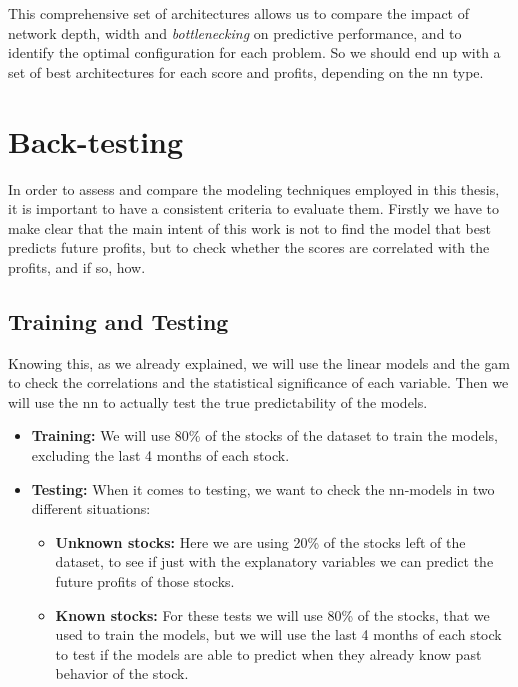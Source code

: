 \documentclass[11pt,english,a4paper,hidelinks]{book}
\begin{document}
\noindent
This comprehensive set of architectures allows us to compare the impact of network depth, width and \textit{bottlenecking} on predictive performance, and to identify the optimal configuration for each problem. So we should end up with a set of best architectures for each score and profits, depending on the \acrshort{nn} type.


\section{Back-testing}

In order to assess and compare the modeling techniques employed in this thesis, it is important to have a consistent criteria to evaluate them. Firstly we have to make clear that the main intent of this work is not to find the model that best predicts future profits, but to check whether the scores are correlated with the profits, and if so, how.

\subsection{Training and Testing}
\noindent
Knowing this, as we already explained, we will use the linear models and the \acrshort{gam} to check the correlations and the statistical significance of each variable. Then we will use the \acrshort{nn} to actually test the true predictability of the models. 

\begin{itemize}
    \item \textbf{Training:} We will use 80\% of the stocks of the dataset to train the models, excluding the last 4 months of each stock.
    \item \textbf{Testing:} When it comes to testing, we want to check the \acrshort{nn}-models in two different situations:
    \begin{itemize}
        \item \textbf{Unknown stocks:} Here we are using 20\% of the stocks left of the dataset, to see if just with the explanatory variables we can predict the future profits of those stocks.
        \item \textbf{Known stocks:} For these tests we will use 80\% of the stocks, that we used to train the models, but we will use the last 4 months of each stock to test if the models are able to predict when they already know past behavior of the stock.
    \end{itemize}
\end{itemize}
\end{document}
